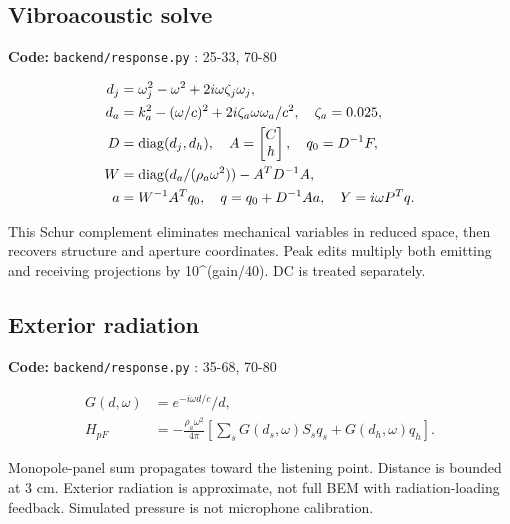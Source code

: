 \documentclass[10pt,a4paper]{article}
\newcommand{\loc}[1]{{\small\color{ink}\textbf{Code:} #1\par}}
\begin{document}
\begin{samepage}\subsection{Vibroacoustic solve}
\loc{\texttt{backend/response.py} : 25-33, 70-80}
\begin{align}d_j&=\omega_j^2-\omega^2+2i\omega\zeta_j\omega_j,\\
d_a&=k_a^2-(\omega/c)^2+2i\zeta_a\omega\omega_a/c^2,\quad\zeta_a=0.025,\\
D&=\operatorname{diag}(d_j,d_h),\quad A=\begin{bmatrix}C\\h\end{bmatrix},\quad q_0=D^{-1}F,\\
W&=\operatorname{diag}(d_a/(\rho_a\omega^2))-A^TD^{-1}A,\\
a&=W^{-1}A^Tq_0,\quad q=q_0+D^{-1}Aa,\quad Y=i\omega P^Tq.\end{align}

This Schur complement eliminates mechanical variables in reduced space, then recovers structure and aperture coordinates. Peak edits multiply both emitting and receiving projections by 10\textasciicircum{}(gain/40). DC is treated separately.\par
\end{samepage}
\begin{samepage}\subsection{Exterior radiation}
\loc{\texttt{backend/response.py} : 35-68, 70-80}
\begin{align}G(d,\omega)&=e^{-i\omega d/c}/d,\\
H_{pF}&=-\frac{\rho_a\omega^2}{4\pi}\left[\sum_sG(d_s,\omega)S_s q_s+G(d_h,\omega)q_h\right].\end{align}

Monopole-panel sum propagates toward the listening point. Distance is bounded at 3 cm. Exterior radiation is approximate, not full BEM with radiation-loading feedback. Simulated pressure is not microphone calibration.\par
\end{samepage}
\end{document}
